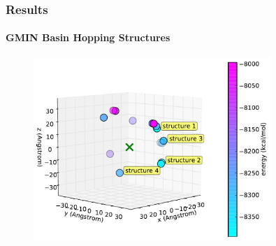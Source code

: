 \documentclass[english]{beamer}
\begin{document}
\begin{frame}
    \frametitle{Results}
    \framesubtitle{GMIN Basin Hopping Structures} 

    \vspace{0.10\topmargin}

%
%

        \begin{figure}
            \includegraphics[width=0.8\textwidth]{figures/GMIN/CitA_phi_theta_3D.pdf}
        \end{figure}      


\end{frame}     


\end{document}
